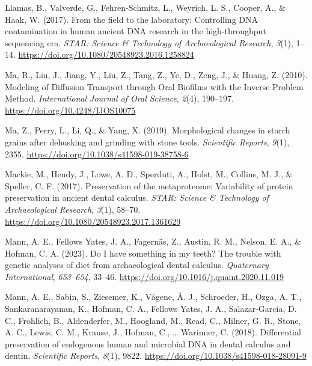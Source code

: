 \documentclass[
  b5paper,
]{book}
\newlength{\cslhangindent}
\newenvironment{CSLReferences}[2] %
 {\begin{list}{}{%
  \setlength{\itemindent}{0pt}
  \setlength{\leftmargin}{0pt}
  \setlength{\parsep}{0pt}
  \ifodd #1
   \setlength{\leftmargin}{\cslhangindent}
   \setlength{\itemindent}{-1\cslhangindent}
  \fi
  \setlength{\itemsep}{#2\baselineskip}}}
 {\end{list}}
\begin{document}
\begin{CSLReferences}{1}{0}
Llamas, B., Valverde, G., Fehren-Schmitz, L., Weyrich, L. S., Cooper,
A., \& Haak, W. (2017). From the field to the laboratory: {Controlling
DNA} contamination in human ancient {DNA} research in the
high-throughput sequencing era. \emph{STAR: Science \& Technology of
Archaeological Research}, \emph{3}(1), 1--14.
\url{https://doi.org/10.1080/20548923.2016.1258824}

Ma, R., Liu, J., Jiang, Y., Liu, Z., Tang, Z., Ye, D., Zeng, J., \&
Huang, Z. (2010). Modeling of {Diffusion Transport} through {Oral
Biofilms} with the {Inverse Problem Method}. \emph{International Journal
of Oral Science}, \emph{2}(4), 190--197.
\url{https://doi.org/10.4248/IJOS10075}

Ma, Z., Perry, L., Li, Q., \& Yang, X. (2019). Morphological changes in
starch grains after dehusking and grinding with stone tools.
\emph{Scientific Reports}, \emph{9}(1), 2355.
\url{https://doi.org/10.1038/s41598-019-38758-6}

Mackie, M., Hendy, J., Lowe, A. D., Sperduti, A., Holst, M., Collins, M.
J., \& Speller, C. F. (2017). Preservation of the metaproteome:
Variability of protein preservation in ancient dental calculus.
\emph{STAR: Science \& Technology of Archaeological Research},
\emph{3}(1), 58--70. \url{https://doi.org/10.1080/20548923.2017.1361629}

Mann, A. E., Fellows Yates, J. A., Fagernäs, Z., Austin, R. M., Nelson,
E. A., \& Hofman, C. A. (2023). Do {I} have something in my teeth? {The}
trouble with genetic analyses of diet from archaeological dental
calculus. \emph{Quaternary International}, \emph{653--654}, 33--46.
\url{https://doi.org/10.1016/j.quaint.2020.11.019}

Mann, A. E., Sabin, S., Ziesemer, K., Vågene, Å. J., Schroeder, H.,
Ozga, A. T., Sankaranarayanan, K., Hofman, C. A., Fellows Yates, J. A.,
Salazar-García, D. C., Frohlich, B., Aldenderfer, M., Hoogland, M.,
Read, C., Milner, G. R., Stone, A. C., Lewis, C. M., Krause, J., Hofman,
C., \ldots{} Warinner, C. (2018). Differential preservation of
endogenous human and microbial {DNA} in dental calculus and dentin.
\emph{Scientific Reports}, \emph{8}(1), 9822.
\url{https://doi.org/10.1038/s41598-018-28091-9}


\end{CSLReferences}
\end{document}
